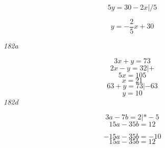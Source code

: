 \documentclass[11pt]{article}
\begin{document}
\begin{enumerate}
\begin{enumerate}
\begin{equation}
5y = 30 -2x | / 5
\end{equation}

\begin{equation}
y = -\frac{2}{5}x + 30
\end{equation}

\emph{182a}

\begin{equation}
3x + y = 73
\end{equation}
\begin{equation}
2x -y = 32 | +
\end{equation}
\begin{equation}
5x = 105
\end{equation}
\begin{equation}
x = 21
\end{equation}
\begin{equation}
63 + y = 73 | - 63
\end{equation}
\begin{equation}
y = 10
\end{equation}
\emph{182d}

\begin{equation}
3a - 7b = 2 | *-5
\end{equation}
\begin{equation}
15a - 35b = 12
\end{equation}

\begin{equation}
-15a - 35b = -10 
\end{equation}
\begin{equation}
15a - 35b = 12
\end{equation}
\end{enumerate}
\end{enumerate}
\end{document}

